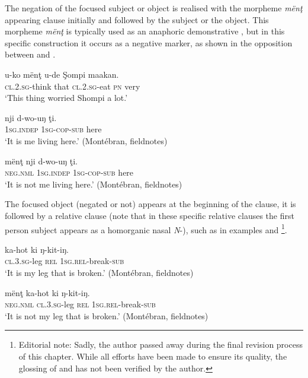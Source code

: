 \documentclass[output=paper,colorlinks,citecolor=brown]{langscibook}
\begin{document}
The negation of the focused subject or object is realised with the morpheme \textit{mënţ} appearing clause initially and followed by the subject or the object. This morpheme \textit{mënţ} is typically used as an anaphoric demonstrative , but in this specific construction it occurs as a negative marker, as shown in the opposition between  and .

\ea\label{ex:mank:add2}
\gll u-ko mënţ u-de Şompi maakan. \\
    \textsc{cl.2.sg}-think that \textsc{cl.2.sg}-eat \textsc{pn} very \\
\glt ‘This thing worried Shompi a lot.’ \citep[125]{Gaved2020}\\
\z 

\ea\label{ex:mank:61}
    \gll nji d-wo-uŋ ţi.\\
         \textsc{1sg.indep} \textsc{1sg-cop-sub} here\\
    \glt ‘It is me living here.’ (Montébran, fieldnotes)
\z

\ea\label{ex:mank:62}
    \gll mënţ nji d-wo-uŋ ţi.\\
         \textsc{neg.nml} \textsc{1sg.indep} \textsc{1sg-cop-sub} here\\
    \glt ‘It is not me living here.’ (Montébran, fieldnotes)
\z


The focused object (negated or not) appears at the beginning of the clause, it is followed by a relative clause (note that in these specific relative clauses the first person subject appears as a homorganic nasal \textit{N}{}-), such as in examples  and \footnote{Editorial note: Sadly, the author passed away during the final revision process of this chapter. While all efforts have been made to ensure its quality, the glossing of  and  has not been verified by the author.}.


\ea\label{ex:mank:63}
    \gll ka-hot ki ŋ-kit-iŋ.\\
         \textsc{cl.3.sg}-leg \textsc{rel} \textsc{1sg.rel}-break-\textsc{sub}\\
    \glt ‘It is my leg that is broken.’ (Montébran, fieldnotes)
\z

\ea\label{ex:mank:64}
    \gll mënţ ka-hot ki ŋ-kit-iŋ.\\
         \textsc{neg.nml} \textsc{cl.3.sg}-leg \textsc{rel} \textsc{1sg.rel}-break-\textsc{sub}\\
    \glt ‘It is not my leg that is broken.’ (Montébran, fieldnotes)
\z
\end{document}
